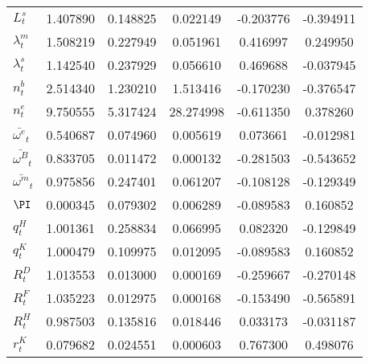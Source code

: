 \begin{center}
\begin{longtable}{lccccc}
$ L^s_t                     $	 & 	        1.407890	 & 	        0.148825	 & 	        0.022149	 & 	       -0.203776	 & 	       -0.394911 \\ 
$ \lambda^m_t               $	 & 	        1.508219	 & 	        0.227949	 & 	        0.051961	 & 	        0.416997	 & 	        0.249950 \\ 
$ \lambda^s_t               $	 & 	        1.142540	 & 	        0.237929	 & 	        0.056610	 & 	        0.469688	 & 	       -0.037945 \\ 
$ n^b_t                     $	 & 	        2.514340	 & 	        1.230210	 & 	        1.513416	 & 	       -0.170230	 & 	       -0.376547 \\ 
$ n^e_t                     $	 & 	        9.750555	 & 	        5.317424	 & 	       28.274998	 & 	       -0.611350	 & 	        0.378260 \\ 
$ \bar{\omega^e}_t          $	 & 	        0.540687	 & 	        0.074960	 & 	        0.005619	 & 	        0.073661	 & 	       -0.012981 \\ 
$ \bar{\omega^B}_t          $	 & 	        0.833705	 & 	        0.011472	 & 	        0.000132	 & 	       -0.281503	 & 	       -0.543652 \\ 
$ \bar{\omega^m}_t          $	 & 	        0.975856	 & 	        0.247401	 & 	        0.061207	 & 	       -0.108128	 & 	       -0.129349 \\ 
$ \PI                       $	 & 	        0.000345	 & 	        0.079302	 & 	        0.006289	 & 	       -0.089583	 & 	        0.160852 \\ 
$ q^H_t                     $	 & 	        1.001361	 & 	        0.258834	 & 	        0.066995	 & 	        0.082320	 & 	       -0.129849 \\ 
$  q^K_t                    $	 & 	        1.000479	 & 	        0.109975	 & 	        0.012095	 & 	       -0.089583	 & 	        0.160852 \\ 
$  R^D_t                    $	 & 	        1.013553	 & 	        0.013000	 & 	        0.000169	 & 	       -0.259667	 & 	       -0.270148 \\ 
$ R^F_t                     $	 & 	        1.035223	 & 	        0.012975	 & 	        0.000168	 & 	       -0.153490	 & 	       -0.565891 \\ 
$   R^H_t                   $	 & 	        0.987503	 & 	        0.135816	 & 	        0.018446	 & 	        0.033173	 & 	       -0.031187 \\ 
$ r^K_t                     $	 & 	        0.079682	 & 	        0.024551	 & 	        0.000603	 & 	        0.767300	 & 	        0.498076 \\ 

\end{longtable}
\end{center}
